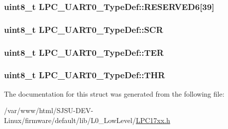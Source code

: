 \subsubsection[{\texorpdfstring{R\+E\+S\+E\+R\+V\+E\+D6}{RESERVED6}}]{\setlength{\rightskip}{0pt plus 5cm}uint8\+\_\+t L\+P\+C\+\_\+\+U\+A\+R\+T0\+\_\+\+Type\+Def\+::\+R\+E\+S\+E\+R\+V\+E\+D6\mbox{[}39\mbox{]}}\hypertarget{structLPC__UART0__TypeDef_a0cfc37662012c7c04d4539d88baa86f0}{}\label{structLPC__UART0__TypeDef_a0cfc37662012c7c04d4539d88baa86f0}
\subsubsection[{\texorpdfstring{S\+CR}{SCR}}]{ uint8\+\_\+t L\+P\+C\+\_\+\+U\+A\+R\+T0\+\_\+\+Type\+Def\+::\+S\+CR}\hypertarget{structLPC__UART0__TypeDef_af6f9e363ab197419959def6cb8dda0bf}{}\label{structLPC__UART0__TypeDef_af6f9e363ab197419959def6cb8dda0bf}
\subsubsection[{\texorpdfstring{T\+ER}{TER}}]{ uint8\+\_\+t L\+P\+C\+\_\+\+U\+A\+R\+T0\+\_\+\+Type\+Def\+::\+T\+ER}\hypertarget{structLPC__UART0__TypeDef_a195604b4a6e90d997b832156b842aa3d}{}\label{structLPC__UART0__TypeDef_a195604b4a6e90d997b832156b842aa3d}
\subsubsection[{\texorpdfstring{T\+HR}{THR}}]{ uint8\+\_\+t L\+P\+C\+\_\+\+U\+A\+R\+T0\+\_\+\+Type\+Def\+::\+T\+HR}\hypertarget{structLPC__UART0__TypeDef_a6a75cbd28dbb9e5bb7ddd9c1dfd80443}{}\label{structLPC__UART0__TypeDef_a6a75cbd28dbb9e5bb7ddd9c1dfd80443}


The documentation for this struct was generated from the following file\+:\begin{DoxyCompactItemize}
\item 
/var/www/html/\+S\+J\+S\+U-\/\+D\+E\+V-\/\+Linux/firmware/default/lib/\+L0\+\_\+\+Low\+Level/\hyperlink{LPC17xx_8h}{L\+P\+C17xx.\+h}\end{DoxyCompactItemize}
